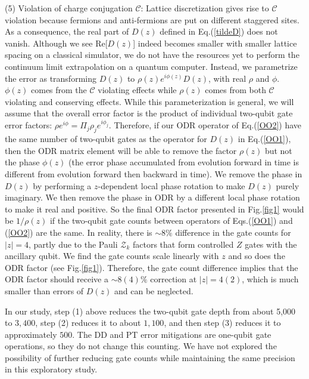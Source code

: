 \documentclass[aps,prd,twocolumn,tightenlines,superscriptaddress,
nofootinbib,preprintnumbers]{revtex4-1}
\begin{document}
(5) Violation of charge conjugation $\mathcal{C}$: Lattice discretization gives rise to $\mathcal{C}$ violation because fermions and anti-fermions are put on different staggered sites. As a consequence, the real part of $D(z)$ defined in Eq.(\ref{tildeD}) does not vanish. Although we see Re[$D(z)$] indeed becomes smaller with smaller lattice spacing on a classical simulator, we do not have the resources yet to perform the continuum limit extrapolation on a quantum computer. Instead, we parametrize the error as transforming $D(z)$ to $\rho(z) e^{i\phi(z)}D(z)$, with real $\rho$ and $\phi$. $\phi(z)$ comes from the $\mathcal{C}$ violating effects while $\rho(z)$ comes from both $\mathcal{C}$ violating and conserving effects. While this parameterization is general, we will assume that the overall error factor is the product of individual two-qubit gate error factors: 
$\rho e^{i\phi}=\Pi_j \rho_j e^{i\phi_j}$.
Therefore, if our ODR operator of Eq.(\ref{OO2}) have the same number of two-qubit gates as the operator for $D(z)$ in Eq.(\ref{OO1}), then the ODR matrix element will be able to remove the factor $\rho(z)$ but not the phase $\phi(z)$ (the error phase accumulated from evolution forward in time is different from evolution forward then backward in time). We remove the phase in $D(z)$ by performing a $z$-dependent local phase rotation to make $D(z)$ purely imaginary. We then remove the phase in ODR by a different local phase rotation to make it real and positive. So the final ODR factor presented in Fig.\ref{fig1} would be $1/\rho(z)$ if the two-qubit gate counts between operators of Eqs.(\ref{OO1}) and (\ref{OO2}) are the same. In reality, there is $\sim 8\%$ difference in the gate counts for $|z|=4$, partly due to the Pauli $\mathcal{Z}_k$ factors that form controlled $Z$ gates with the ancillary qubit. We find the gate counts scale linearly with $z$ and so does the ODR factor (see Fig.\ref{fig1}). Therefore, the gate count difference implies that the ODR factor should receive a $\sim 8(4)\%$ correction at $|z|=4(2)$, which is much smaller than errors of $D(z)$ and can be neglected. 

In our study, step (1) above reduces the two-qubit gate depth from about 5,000 to $3,400$, step (2) reduces it to about $1,100$, and then step (3) reduces it to approximately $500$. The DD and PT error mitigations are one-qubit gate operations, so they do not change this counting. We have not explored the possibility of further reducing gate counts while maintaining the same precision in this exploratory study. 
\end{document}
